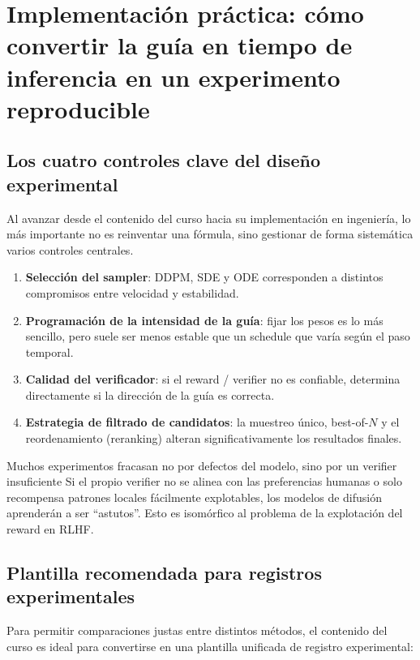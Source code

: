 \section{Implementación práctica: cómo convertir la guía en tiempo de inferencia en un experimento reproducible}

\subsection{Los cuatro controles clave del diseño experimental}

Al avanzar desde el contenido del curso hacia su implementación en ingeniería, lo más importante no es reinventar una fórmula, sino gestionar de forma sistemática varios controles centrales.

\begin{enumerate}
    \item \textbf{Selección del sampler}: DDPM, SDE y ODE corresponden a distintos compromisos entre velocidad y estabilidad.
    \item \textbf{Programación de la intensidad de la guía}: fijar los pesos es lo más sencillo, pero suele ser menos estable que un schedule que varía según el paso temporal.
    \item \textbf{Calidad del verificador}: si el reward / verifier no es confiable, determina directamente si la dirección de la guía es correcta.
    \item \textbf{Estrategia de filtrado de candidatos}: la muestreo único, best-of-$N$ y el reordenamiento (reranking) alteran significativamente los resultados finales.
\end{enumerate}

\begin{importantbox}{Muchos experimentos fracasan no por defectos del modelo, sino por un verifier insuficiente}
Si el propio verifier no se alinea con las preferencias humanas o solo recompensa patrones locales fácilmente explotables, los modelos de difusión aprenderán a ser ``astutos''. Esto es isomórfico al problema de la explotación del reward en RLHF.
\end{importantbox}

\subsection{Plantilla recomendada para registros experimentales}

Para permitir comparaciones justas entre distintos métodos, el contenido del curso es ideal para convertirse en una plantilla unificada de registro experimental:

